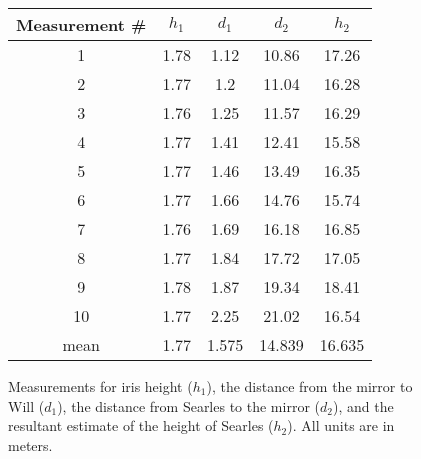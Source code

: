 \documentclass[11pt]{article}
\begin{document}
\begin{figure}
\label{measurements}
\centering
\begin{tabular}{ccccc}
\toprule
Measurement \# & $h_1$ & $d_1$ & $d_2$ & $h_2$ \\
\midrule
1 & 1.78 & 1.12 & 10.86 & 17.26 \\
2 & 1.77 & 1.2 & 11.04 & 16.28 \\
3 & 1.76 & 1.25 & 11.57 & 16.29 \\
4 & 1.77 & 1.41 & 12.41 & 15.58 \\
5 & 1.77 & 1.46 & 13.49 & 16.35 \\
6 & 1.77 & 1.66 & 14.76 & 15.74 \\
7 & 1.76 & 1.69 & 16.18 & 16.85 \\
8 & 1.77 & 1.84 & 17.72 & 17.05 \\
9 & 1.78 & 1.87 & 19.34 & 18.41 \\
10 & 1.77 & 2.25 & 21.02 & 16.54 \\
\midrule
mean & 1.77 & 1.575 & 14.839 & 16.635 \\
\bottomrule
\end{tabular}
\caption{Measurements for iris height ($h_1$), the distance from the mirror to Will ($d_1$), the distance from Searles to the mirror ($d_2$), and the resultant estimate of the height of Searles ($h_2$). All units are in meters.}
\end{figure}




\end{document}
